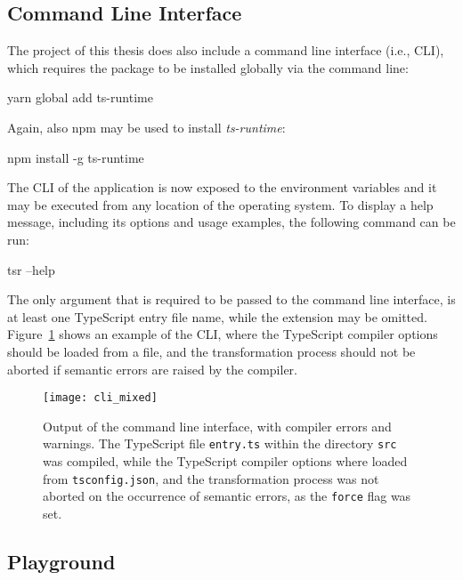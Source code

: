 \subsection{Command Line Interface}
\label{sec:usage-cli}

The project of this thesis does also include a command line interface (i.e., CLI), which requires the package to be installed globally via the command line:
\begin{JsCode}[numbers=none]
yarn global add ts-runtime
\end{JsCode}
Again, also npm may be used to install \emph{ts-runtime}:
\begin{JsCode}[numbers=none]
npm install -g ts-runtime
\end{JsCode}
The CLI of the application is now exposed to the environment variables and it may be executed from any location of the operating system. To display a help message, including its options and usage examples, the following command can be run:
\begin{JsCode}[numbers=none]
tsr --help
\end{JsCode}
The only argument that is required to be passed to the command line interface, is at least one TypeScript entry file name, while the extension may be omitted. Figure~\ref{fig:cli} shows an example of the CLI, where the TypeScript compiler options should be loaded from a file, and the transformation process should not be aborted if semantic errors are raised by the compiler.
\begin{figure}
\centering
\texttt{[image: cli\_mixed]}
\caption{Output of the command line interface, with compiler errors and warnings. The TypeScript file \texttt{entry.ts} within the directory \texttt{src} was compiled, while the TypeScript compiler options where loaded from \texttt{tsconfig.json}, and the transformation process was not aborted on the occurrence of semantic errors, as the \texttt{force} flag was set.}
\label{fig:cli}
\end{figure}

\subsection{Playground}
\label{sec:usage-playground}

